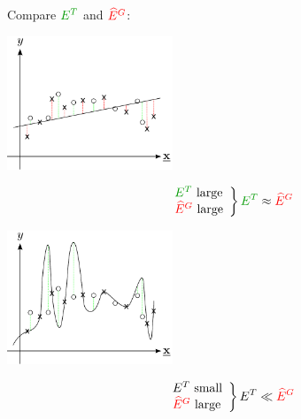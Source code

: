 \begin{frame} \frametitle{\subsecname}
Compare ${\color{darkgreen}E^T}$ and ${\color{red} \widehat E^G}$:\\

	\begin{minipage}{3.5cm}
	\begin{center}
		\includegraphics[height=4cm]{img/section1_fig28}
	\end{center}
	\pause
	\begin{equation}
			\left.
			\begin{array}{l}
			  {\color{darkgreen}E^T} \text{ large} \\
			  {\color{red} \widehat E^G} \text{ large}
			\end{array} \right \} {\color{darkgreen}E^T} \approx {\color{red} \widehat E^G}
	\end{equation}
	\end{minipage}
	\pause
	\hspace{2.5cm}
	\begin{minipage}{3.5cm}
	\begin{center}
		\includegraphics[height=4cm]{img/section1_fig30}
	\end{center}
	\pause
	\begin{equation}
			\left. \begin{array}{l}
				E^T \text{ small} \\
				{\color{red} \widehat E^G} \text{ large}
			\end{array} \right \} E^T \ll {\color{red}\widehat E^G}
	\end{equation}
	\end{minipage}
\end{frame}


